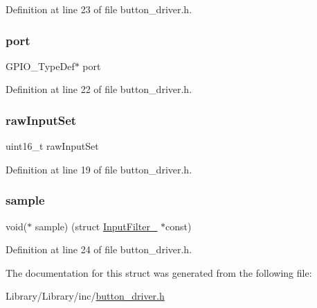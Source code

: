 Definition at line 23 of file button\+\_\+driver.\+h.

\mbox{\label{struct_input_filter___a82241972e0292c7de95ea1e293e11be3}} 
\subsubsection{\texorpdfstring{port}{port}}
{\footnotesize\ttfamily G\+P\+I\+O\+\_\+\+Type\+Def$\ast$ port}



Definition at line 22 of file button\+\_\+driver.\+h.

\mbox{\label{struct_input_filter___a295d2f6601495531b475a5965dd36c4b}} 
\subsubsection{\texorpdfstring{raw\+Input\+Set}{rawInputSet}}
{\footnotesize\ttfamily uint16\+\_\+t raw\+Input\+Set}



Definition at line 19 of file button\+\_\+driver.\+h.

\mbox{\label{struct_input_filter___aa2061c47d432d006a5b91e831536710a}} 
\subsubsection{\texorpdfstring{sample}{sample}}
{\footnotesize\ttfamily void($\ast$ sample) (struct \mbox{\hyperlink{struct_input_filter__}{Input\+Filter\+\_\+}} $\ast$const)}



Definition at line 24 of file button\+\_\+driver.\+h.



The documentation for this struct was generated from the following file\+:\begin{DoxyCompactItemize}
\item 
Library/\+Library/inc/\mbox{\hyperlink{button__driver_8h}{button\+\_\+driver.\+h}}\end{DoxyCompactItemize}
